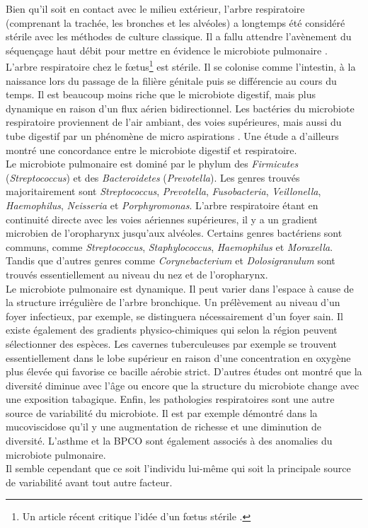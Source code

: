 \documentclass[12pt,a4paper]{article}
\begin{document}
Bien qu'il soit en contact avec le milieu extérieur, l’arbre respiratoire (comprenant la trachée, les bronches et les alvéoles) a longtemps été considéré stérile avec les méthodes de culture classique. Il a fallu attendre l’avènement du séquençage haut débit pour mettre en évidence le microbiote pulmonaire \cite{Hilty2010,HoMan2017,Beck,Dicksonb}.\\
L'arbre respiratoire chez le fœtus\footnote{Un article récent critique l'idée d'un fœtus stérile \cite{Perez-Munoz2017}.} est stérile. Il se colonise comme l'intestin, à la naissance lors du passage de la filière génitale puis se différencie au cours du temps. Il est beaucoup moins riche que le microbiote digestif, mais plus dynamique en raison d'un flux aérien bidirectionnel.  Les bactéries du microbiote respiratoire proviennent de l’air ambiant, des voies supérieures, mais aussi du tube digestif par un phénomène de micro aspirations \cite{Dickson}. Une étude a d'ailleurs montré une concordance entre le microbiote digestif et respiratoire\cite{Dickson}.\\
Le microbiote pulmonaire est dominé par le phylum des \textit{Firmicutes} (\textit{Streptococcus}) et des \textit{Bacteroidetes} (\textit{Prevotella}). Les genres trouvés majoritairement sont \textit{Streptococcus}, \textit{Prevotella}, \textit{Fusobacteria}, \textit{Veillonella}, \textit{Haemophilus}, \textit{Neisseria} et \textit{Porphyromonas}.
L’arbre respiratoire étant en continuité directe avec les voies aériennes supérieures, il y a un gradient microbien de l'oropharynx jusqu'aux alvéoles. Certains genres bactériens sont communs, comme \textit{Streptococcus}, \textit{Staphylococcus}, \textit{Haemophilus} et \textit{Moraxella}. Tandis que d’autres genres comme \textit{Corynebacterium} et \textit{Dolosigranulum} sont trouvés essentiellement au niveau du nez et de l'oropharynx. \\
Le microbiote pulmonaire est dynamique. Il peut varier dans l'espace à cause de la structure irrégulière de l'arbre bronchique. Un prélèvement au niveau d'un foyer infectieux, par exemple, se distinguera nécessairement d'un foyer sain. Il existe également des gradients physico-chimiques qui selon la région peuvent sélectionner des espèces. Les cavernes tuberculeuses par exemple se trouvent essentiellement dans le lobe supérieur en raison d'une concentration en oxygène plus élevée qui favorise ce bacille aérobie strict. D'autres études \cite{Frayman2017,Coburn2015} ont montré que la diversité diminue avec l'âge ou encore que la structure du microbiote change avec une exposition tabagique.
Enfin, les pathologies respiratoires\cite{HoMan2017} sont une autre source de variabilité du microbiote. Il est par exemple démontré dans la mucoviscidose qu'il y une augmentation de richesse et une diminution de diversité. L'asthme et la BPCO sont également associés à des anomalies du microbiote pulmonaire\cite{Dicksona,Nguyen2015}.  \\
Il semble cependant que ce soit l'individu lui-même qui soit la principale source de variabilité avant tout autre facteur\cite{Whelan2017}.
\end{document}
